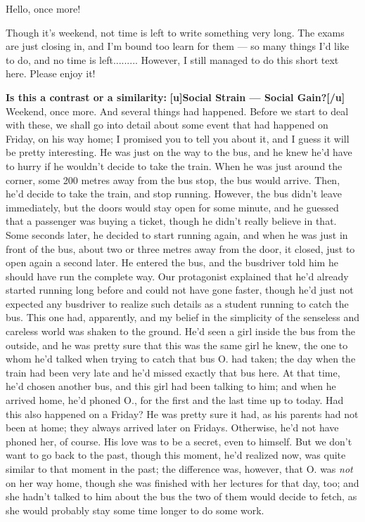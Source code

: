 Hello, once more!

Though it's weekend, not time is left to write something very long. The exams are just closing in, and I'm bound too learn for them --- so many things I'd like to do, and no time is left.........
However, I still managed to do this short text here. Please enjoy it!

\textbf{Is this a contrast or a similarity:}
\textbf{[u]Social Strain --- Social Gain?[/u]}
Weekend, once more. And several things had happened. Before we start to deal with these, we shall go into detail about some event that had happened on Friday, on his way home; I promised you to tell you about it, and I guess it will be pretty interesting. 
He was just on the way to the bus, and he knew he'd have to hurry if he wouldn't decide to take the train. When he was just around the corner, some 200 metres away from the bus stop, the bus would arrive. Then, he'd decide to take the train, and stop running. However, the bus didn't leave immediately, but the doors would stay open for some minute, and he guessed that a passenger was buying a ticket, though he didn't really believe in that. Some seconds later, he decided to start running again, and when he was just in front of the bus, about two or three metres away from the door, it closed, just to open again a second later. He entered the bus, and the busdriver told him he should have run the complete way. Our protagonist explained that he'd already started running long before and could not have gone faster, though he'd just not expected any busdriver to realize such details as a student running to catch the bus. This one had, apparently, and my belief in the simplicity of the senseless and careless world was shaken to the ground. 
He'd seen a girl inside the bus from the outside, and he was pretty sure that this was the same girl he knew, the one to whom he'd talked when trying to catch that bus O. had taken; the day when the train had been very late and he'd missed exactly that bus here. At that time, he'd chosen another bus, and this girl had been talking to him; and when he arrived home, he'd phoned O., for the first and the last time up to today. 
Had this also happened on a Friday? He was pretty sure it had, as his parents had not been at home; they always arrived later on Fridays. 
Otherwise, he'd not have phoned her, of course. 
His love was to be a secret, even to himself. 
But we don't want to go back to the past, though this moment, he'd realized now, was quite similar to that moment in the past; the difference was, however, that O. was \emph{not} on her way home, though she was finished with her lectures for that day, too; and she hadn't talked to him about the bus the two of them would decide to fetch, as she would probably stay some time longer to do some work. 
